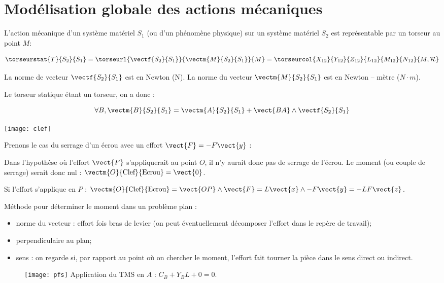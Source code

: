 \section{Modélisation globale des actions mécaniques}

\begin{defi}

L'action mécanique d'un système matériel $S_1$ (ou d'un phénomène physique) sur un système matériel $S_2$ est représentable par un torseur au point $M$:

$$
\torseurstat{T}{S_2}{S_1}
=\torseurl{\vectf{S_2}{S_1}}{\vectm{M}{S_2}{S_1}}{M}
=\torseurcol{X_{12}}{Y_{12}}{Z_{12}}{L_{12}}{M_{12}}{N_{12}}{M,\mathcal{R}}
$$
\end{defi}
\begin{remarque}
La norme de vecteur $\vectf{S_2}{S_1}$ est en Newton (N). La norme du vecteur $\vectm{M}{S_2}{S_1}$ est en Newton -- mètre ($N\cdot m$).
\end{remarque}

\begin{prop}[Varignon]
Le torseur statique étant un torseur, on a donc : 

$$
\forall B, \vectm{B}{S_2}{S_1} = \vectm{A}{S_2}{S_1} + \vect{BA} \wedge \vectf{S_2}{S_1}
$$
\end{prop}



\begin{marginfigure}
\texttt{[image: clef]}
\end{marginfigure}

\begin{remarque}

Prenons le cas du serrage d'un écrou avec un effort $\vect{F}=-F\vect{y}$ :


Dans l'hypothèse où l'effort $\vect{F}$ s'appliquerait au point $O$, il n'y aurait donc pas de serrage de l'écrou. Le moment (ou couple de serrage) serait donc nul : $\vectm{O}{\text{Clef}}{\text{Ecrou}}=\vect{0}$.

Si l'effort s'applique en $P$ :
$\vectm{O}{\text{Clef}}{\text{Ecrou}}=\vect{OP}\wedge\vect{F}
=L\vect{x}\wedge-F\vect{y}=-LF\vect{z}$.

Méthode pour déterminer le moment dans un problème plan : 
\begin{itemize}
\item norme du vecteur : effort fois bras de levier (on peut éventuellement décomposer l'effort dans le repère de travail);
\item perpendiculaire au plan;
\item sens : on regarde si, par rapport au point où on chercher le moment, l'effort fait tourner la pièce dans le sens direct ou indirect. 
\end{itemize}

\end{remarque}

\begin{figure}[!h]
\centering
\texttt{[image: pfs]}
Application du TMS en $A$ : $C_B + Y_B L + 0 = 0$.
\end{figure}
